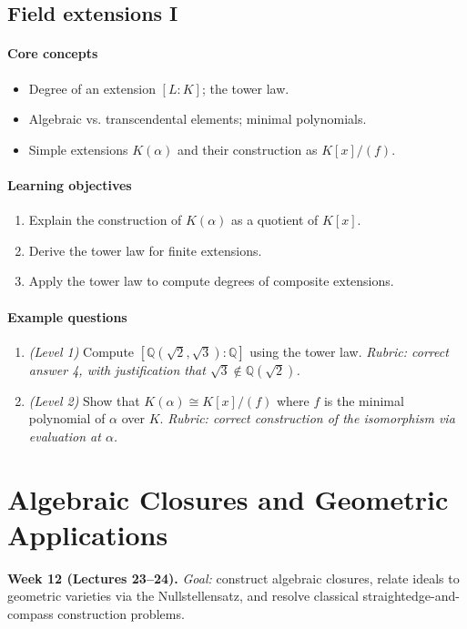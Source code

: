 \documentclass{article}
\begin{document}
\subsection{Field extensions I}
\paragraph{Core concepts}
\begin{itemize}[nosep]
  \item Degree of an extension $[L:K]$; the tower law.
  \item Algebraic vs. transcendental elements; minimal polynomials.
  \item Simple extensions $K(\alpha)$ and their construction as $K[x]/(f)$.
\end{itemize}
\paragraph{Learning objectives}
\begin{enumerate}[nosep]
  \item Explain the construction of $K(\alpha)$ as a quotient of $K[x]$.
  \item Derive the tower law for finite extensions.
  \item Apply the tower law to compute degrees of composite extensions.
\end{enumerate}
\paragraph{Example questions}
\begin{enumerate}[nosep]
  \item \emph{(Level 1)} Compute $[\mathbb{Q}(\sqrt{2},\sqrt{3}):\mathbb{Q}]$ using the tower law. \emph{Rubric: correct answer 4, with justification that $\sqrt{3}\notin\mathbb{Q}(\sqrt2)$.}
  \item \emph{(Level 2)} Show that $K(\alpha) \cong K[x]/(f)$ where $f$ is the minimal polynomial of $\alpha$ over $K$. \emph{Rubric: correct construction of the isomorphism via evaluation at $\alpha$.}
\end{enumerate}

\section{Algebraic Closures and Geometric Applications}
\textbf{Week 12 (Lectures 23--24).} \emph{Goal:} construct algebraic closures, relate ideals to geometric varieties via the Nullstellensatz, and resolve classical straightedge-and-compass construction problems.
\end{document}
